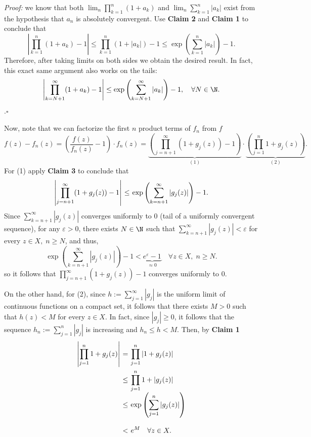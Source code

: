 \textit{Proof:} we know that both $\lim_n \prod_{k = 1}^{n} (1+a_k)$ and $\lim_n \sum_{k = 1}^{n}|a_k|$ exist from the hypothesis that $a_n$ is absolutely convergent. Use \textbf{Claim 2} and \textbf{Claim 1} to conclude that
\[ \left| \prod_{k = 1}^{n} (1+a_k) - 1 \right| \leq  \prod_{k = 1}^{n} (1+|a_k|) - 1 \leq \exp\left( \sum_{k = 1}^n |a_k|\right) - 1.\]
Therefore, after taking limits on both sides we obtain the desired result. In fact, this exact same argument also works on the tails:
\[ \left| \prod_{k = N+1}^{\infty} (1+a_k) - 1 \right| \leq \exp\left( \sum_{k = N+1}^{\infty} |a_k| \right) - 1,\quad \forall N \in \N. \]
.\hfill $\square$

Now, note that we can factorize the first $n$ product terms of $f_n$ from $f$ 
\[ f(z) - f_n(z) =  \left( \frac{f(z)}{f_n(z)} - 1 \right)\cdot f_n(z) = \underbrace{\left( \prod_{j = n+1}^{\infty} (1+g_j(z)) - 1 \right)}_{(1)} \cdot \underbrace{\left( \prod_{j = 1}^{n} 1+g_j(z) \right)}_{(2)}. \]
For (1) apply \textbf{Claim 3} to conclude that
\[ \everymath{\displaystyle}
\arraycolsep=1.8pt\def\arraystretch{2.5}
\begin{array}{rcl}
    \left| \prod_{j = n+1}^{\infty} (1+g_j(z)) - 1 \right| & \leq & \exp \left( \sum_{k = n+1}^{\infty} |g_j(z)| \right) - 1.
\end{array} \]
Since $\sum_{k = n+1}^{\infty} |g_j(z)|$ converges uniformly to 0 (tail of a uniformly convergent sequence), for any $\varepsilon > 0$, there exists $N \in \N$ such that $\sum_{k = n+1}^{\infty} |g_j(z)| < \varepsilon$ for every $z \in X,\; n \geq N$, and thus,
\[ \exp \left( \sum_{k = n+1}^{\infty} |g_j(z)| \right) - 1 < \underbrace{e^{\varepsilon} - 1}_{\approx 0} \quad \forall z \in X,\; n \geq N. \]
so it follows that $\prod_{j = n+1}^{\infty} (1+g_j(z)) - 1$ converges uniformly to 0.

On the other hand, for (2), since $h := \sum_{j = 1}^{\infty} |g_j|$ is the uniform limit of continuous functions on a compact set, it follows that there exists $M > 0$ such that $h(z) < M$ for every $z \in X$. In fact, since $|g_j| \geq 0$, it follows that the sequence $h_n := \sum_{j = 1}^n|g_j|$ is increasing and $h_n \leq h < M$. Then, by \textbf{Claim 1}
\[ \everymath{\displaystyle}
\arraycolsep=1.8pt\def\arraystretch{2.5}
\begin{array}{rcl}
    \left|\prod_{j = 1}^{n} 1+g_j(z) \right| & = & \prod_{j = 1}^{n} |1+g_j(z)|\\
    & \leq & \prod_{j = 1}^{n} 1+|g_j(z)|\\
    & \leq & \exp\left( \sum_{j = 1}^n |g_j(z)| \right)\\
    & < & e^M\quad \forall z \in X.
\end{array}\]

